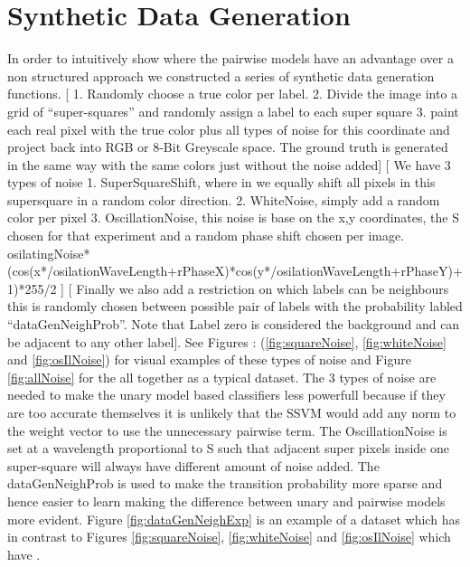 \section{Synthetic Data Generation} \label{sec:synthDataGen}
In order to intuitively show where the pairwise models have an advantage over a non structured approach we constructed a series of synthetic data generation functions.  [ 1. Randomly choose a true color per label. 2. Divide the image into a grid of “super-squares” and randomly assign a label to each super square 3. paint each real pixel with the true color plus all types of noise for this coordinate and project back into RGB or 8-Bit Greyscale space. The ground truth is generated in the same way with the same colors just without the noise added] [ We have 3 types of noise 1. SuperSquareShift, where in we equally shift all pixels in this supersquare in a random color direction. 2. WhiteNoise, simply add a random color per pixel 3. OscillationNoise, this noise is base on the x,y coordinates, the S chosen for that experiment and a random phase shift chosen per image. osilatingNoise*(cos(x*/osilationWaveLength+rPhaseX)*cos(y*/osilationWaveLength+rPhaseY)+1)*255/2 ] [ Finally we also add a restriction on which labels can be neighbours this is randomly chosen between possible pair of labels with the probability labled “dataGenNeighProb”. Note that Label zero is considered the background and can be adjacent to any other label]. See Figures : (\ref{fig:squareNoise}, \ref{fig:whiteNoise} and \ref{fig:osIlNoise}) for visual examples of these types of noise and Figure \ref{fig:allNoise} for the all together as a typical dataset. The 3 types of noise are needed to make the unary model based classifiers less powerfull because if they are too accurate themselves it is unlikely that the SSVM would add any norm to the weight vector to use the unnecessary pairwise term. The OscillationNoise is set at a wavelength proportional to S such that adjacent super pixels inside one super-square will always have different amount of noise added. The  dataGenNeighProb is used to make the transition probability more sparse and hence easier to learn making the difference between unary and pairwise models more evident. Figure \ref{fig:dataGenNeighExp} is an example of  a dataset which has  in contrast to Figures \ref{fig:squareNoise}, \ref{fig:whiteNoise} and \ref{fig:osIlNoise} which have .

